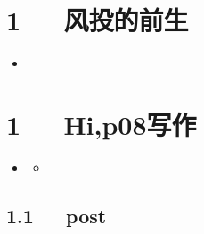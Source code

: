 \documentclass[letterpaper,12pt,english]{sphinxmanual}
\begin{document}
\chapter{1   风投的前生}
\label{\detokenize{p07_u521b_u6295/_u98ce_u6295_u7684_u524d_u751f:id1}}\label{\detokenize{p07_u521b_u6295/_u98ce_u6295_u7684_u524d_u751f::doc}}
\begin{sphinxShadowBox}
\begin{itemize}
\item {} 
\label{\detokenize{p07_u521b_u6295/_u98ce_u6295_u7684_u524d_u751f:id3}}{\hyperref[\detokenize{p07_u521b_u6295/_u98ce_u6295_u7684_u524d_u751f:id1}]{}}

\end{itemize}
\end{sphinxShadowBox}


\chapter{1   Hi,p08写作}
\label{\detokenize{p08_u5199_u4f5c/Hello_uff0cp08_u5199_u4f5c:hi-p08}}\label{\detokenize{p08_u5199_u4f5c/Hello_uff0cp08_u5199_u4f5c::doc}}
\begin{sphinxShadowBox}
\begin{itemize}
\item {} 
\label{\detokenize{p08_u5199_u4f5c/Hello_uff0cp08_u5199_u4f5c:id2}}{\hyperref[\detokenize{p08_u5199_u4f5c/Hello_uff0cp08_u5199_u4f5c:hi-p08}]{}}
\begin{itemize}
\item {} 
\label{\detokenize{p08_u5199_u4f5c/Hello_uff0cp08_u5199_u4f5c:id3}}{\hyperref[\detokenize{p08_u5199_u4f5c/Hello_uff0cp08_u5199_u4f5c:post}]{}}

\end{itemize}

\end{itemize}
\end{sphinxShadowBox}


\section{1.1   post}
\label{\detokenize{p08_u5199_u4f5c/Hello_uff0cp08_u5199_u4f5c:post}}
\end{document}
